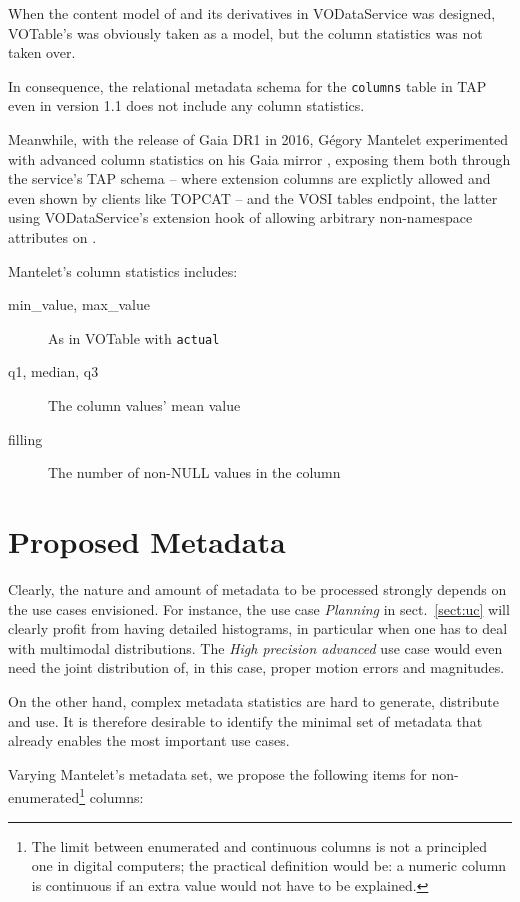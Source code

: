 \documentclass[11pt,a4paper]{ivoa}
\begin{document}
When the content model of  and its derivatives in
VODataService \citep{2010ivoa.spec.1202P} was designed, VOTable's
 was obviously taken as a model, but the column statistics
was not taken over.

In consequence, the relational metadata schema for the
\verb|columns| table in TAP \citep{2019ivoa.spec.0927D} even in
version 1.1 does not include any column statistics.

Meanwhile, with the release of Gaia DR1 in 2016, G\'egory Mantelet
experimented with advanced column statistics on his Gaia mirror
\citep{data:arigaia}, exposing them both through the service's TAP
schema -- where extension columns are explictly allowed and even shown
by clients like TOPCAT \citep{soft:topcat} -- and the VOSI tables
endpoint, the latter using VODataService's extension hook of allowing
arbitrary non-namespace attributes on .

Mantelet's column statistics includes:

\begin{description}
\item[min\_value, max\_value] As in VOTable with  \verb|actual|
\item[q1, median, q3} The four quartiles of the distribution of the
values in the column
\item[mean] The column values' mean value
\item[filling] The number of non-NULL values in the column
\end{description}


\section{Proposed Metadata}

Clearly, the nature and amount of metadata to be processed strongly
depends on the use cases envisioned.  For instance, the use case
\emph{Planning} in sect.~\ref{sect:uc} will clearly profit from having
detailed histograms, in particular when one has to deal with multimodal
distributions.  The \emph{High precision advanced} use case would even
need the joint distribution of, in this case, proper motion errors and
magnitudes.

On the other hand, complex metadata statistics are hard to generate,
distribute and use.  It is therefore desirable to identify the
minimal set of metadata that already enables the most important use
cases.

Varying Mantelet's metadata set, we propose the following items for
non-enumerated\footnote{The limit between enumerated and
continuous columns is not a principled one in digital computers; the
practical definition would be: a numeric column is continuous if an
extra value would not have to be explained.} columns:
\end{document}
